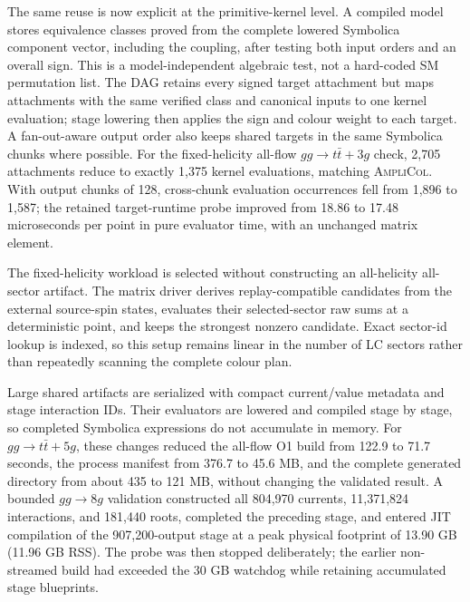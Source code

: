 \documentclass[10pt]{article}
\newcommand{\AC}{\textsc{AmpliCol}}
\begin{document}
The same reuse is now explicit at the primitive-kernel level.  A compiled
model stores equivalence classes proved from the complete lowered Symbolica
component vector, including the coupling, after testing both input orders and
an overall sign.  This is a model-independent algebraic test, not a hard-coded
SM permutation list.  The DAG retains every signed target attachment but maps
attachments with the same verified class and canonical inputs to one kernel
evaluation; stage lowering then applies the sign and colour weight to each
target.  A fan-out-aware output order also keeps shared targets in the same
Symbolica chunks where possible.  For the fixed-helicity all-flow
\(gg\to t\bar t+3g\) check, 2,705 attachments reduce to exactly 1,375 kernel
evaluations, matching \AC.  With output chunks of 128, cross-chunk evaluation
occurrences fell from 1,896 to 1,587; the retained target-runtime probe improved
from 18.86 to 17.48 microseconds per point in pure evaluator time, with an
unchanged matrix element.

The fixed-helicity workload is selected without constructing an all-helicity
all-sector artifact.  The matrix driver derives replay-compatible candidates
from the external source-spin states, evaluates their selected-sector raw sums
at a deterministic point, and keeps the strongest nonzero candidate.  Exact
sector-id lookup is indexed, so this setup remains linear in the number of LC
sectors rather than repeatedly scanning the complete colour plan.

Large shared artifacts are serialized with compact current/value metadata and
stage interaction IDs.  Their evaluators are lowered and compiled stage by
stage, so completed Symbolica expressions do not accumulate in memory.  For
\(gg\to t\bar t+5g\), these changes reduced the all-flow O1 build from
122.9 to 71.7 seconds, the process manifest from 376.7 to 45.6 MB, and the
complete generated directory from about 435 to 121 MB, without changing the
validated result.  A bounded \(gg\to8g\) validation constructed all 804,970
currents, 11,371,824 interactions, and 181,440 roots, completed the preceding
stage, and entered JIT compilation of the 907,200-output stage at a peak
physical footprint of 13.90 GB (11.96 GB RSS).  The probe was then stopped
deliberately; the earlier non-streamed build had exceeded the 30 GB watchdog
while retaining accumulated stage blueprints.


\end{document}
